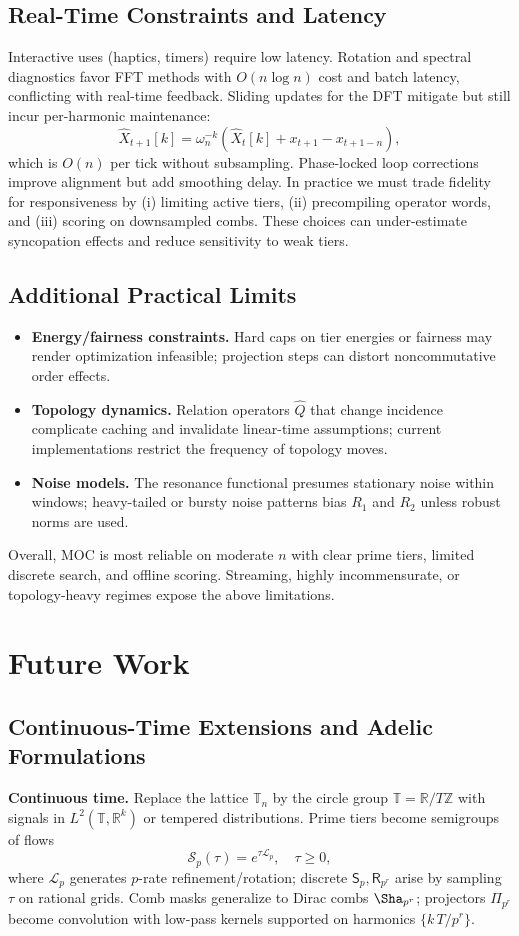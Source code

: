 \documentclass[12pt]{article}
\numberwithin{equation}{section}
\theoremstyle{plain}
\theoremstyle{definition}
\theoremstyle{remark}
\begin{document}
\subsection*{Real-Time Constraints and Latency}
Interactive uses (haptics, timers) require low latency. Rotation and spectral diagnostics favor FFT methods with $O(n\log n)$ cost and batch latency, conflicting with real-time feedback. Sliding updates for the DFT mitigate but still incur per-harmonic maintenance:
\[
\widehat{X}_{t+1}[k]=\omega_n^{-k}\left(\widehat{X}_t[k]+x_{t+1}-x_{t+1-n}\right),
\]
which is $O(n)$ per tick without subsampling. Phase-locked loop corrections improve alignment but add smoothing delay. In practice we must trade fidelity for responsiveness by (i) limiting active tiers, (ii) precompiling operator words, and (iii) scoring on downsampled combs. These choices can under-estimate syncopation effects and reduce sensitivity to weak tiers.

\subsection*{Additional Practical Limits}
\begin{itemize}
  \item \textbf{Energy/fairness constraints.} Hard caps on tier energies or fairness may render optimization infeasible; projection steps can distort noncommutative order effects.
  \item \textbf{Topology dynamics.} Relation operators $\hat{Q}$ that change incidence complicate caching and invalidate linear-time assumptions; current implementations restrict the frequency of topology moves.
  \item \textbf{Noise models.} The resonance functional presumes stationary noise within windows; heavy-tailed or bursty noise patterns bias $R_1$ and $R_2$ unless robust norms are used.
\end{itemize}
Overall, MOC is most reliable on moderate $n$ with clear prime tiers, limited discrete search, and offline scoring. Streaming, highly incommensurate, or topology-heavy regimes expose the above limitations.

\section*{Future Work}

\subsection*{Continuous-Time Extensions and Adelic Formulations}
\textbf{Continuous time.} Replace the lattice $\mathbb{T}_n$ by the circle group $\mathbb{T}=\mathbb{R}/T\mathbb{Z}$ with signals in $L^2(\mathbb{T},\mathbb{R}^k)$ or tempered distributions. Prime tiers become semigroups of flows
\[
\mathcal{S}_p(\tau)=e^{\tau \mathcal{L}_p},\quad \tau\ge 0,
\]
where $\mathcal{L}_p$ generates $p$-rate refinement/rotation; discrete $\mathsf{S}_p,\mathsf{R}_{p^r}$ arise by sampling $\tau$ on rational grids. Comb masks generalize to Dirac combs $\Sha_{p^r}$; projectors $\Pi_{p^r}$ become convolution with low-pass kernels supported on harmonics $\{k\,T/p^r\}$.
\end{document}
